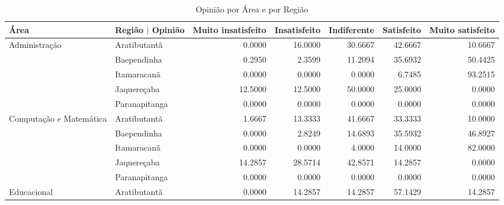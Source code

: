 \begin{table}[ht]
	\scriptsize
	\centering
	\caption{Opinião por Área e por Região} 
	\label{tabela:q15p}
	\vspace{.5em}
\begin{tabular}{ll rrrrr}

  \toprule
 Área                    & Região $\vert$ Opinião & \multicolumn{1}{l}{ Muito insatisfeito} & \multicolumn{1}{l}{ Insatisfeito} & \multicolumn{1}{l}{ Indiferente} & \multicolumn{1}{l}{ Satisfeito} & \multicolumn{1}{l}{ Muito satisfeito} \\ 
   \midrule
Administração           & Aratibutantã            &             0.0000 &      16.0000 &     30.6667 &    42.6667 &          10.6667 \\ 
                          & Baependinha             &             0.2950 &       2.3599 &     11.2094 &    35.6932 &          50.4425 \\ 
                          & Itamaracanã             &             0.0000 &       0.0000 &      0.0000 &     6.7485 &          93.2515 \\ 
                          & Jaquereçaba             &            12.5000 &      12.5000 &     50.0000 &    25.0000 &           0.0000 \\ 
                          & Paranapitanga           &             0.0000 &       0.0000 &      0.0000 &     0.0000 &           0.0000 \\ 
  Computação e Matemática & Aratibutantã            &             1.6667 &      13.3333 &     41.6667 &    33.3333 &          10.0000 \\ 
                          & Baependinha             &             0.0000 &       2.8249 &     14.6893 &    35.5932 &          46.8927 \\ 
                          & Itamaracanã             &             0.0000 &       0.0000 &      4.0000 &    14.0000 &          82.0000 \\ 
                          & Jaquereçaba             &            14.2857 &      28.5714 &     42.8571 &    14.2857 &           0.0000 \\ 
                          & Paranapitanga           &             0.0000 &       0.0000 &      0.0000 &     0.0000 &           0.0000 \\ 
  Educacional             & Aratibutantã            &             0.0000 &      14.2857 &     14.2857 &    57.1429 &          14.2857 \\ 

\end{tabular}
\end{table}
